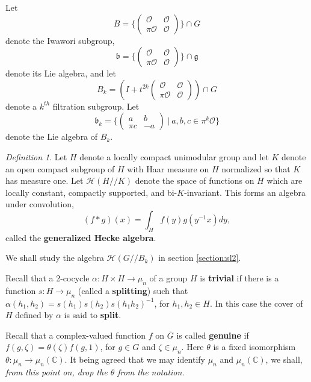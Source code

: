 \documentclass[12pt,letterpaper]{amsart}
\theoremstyle{definition}
\theoremstyle{remark}
\newtheorem{definition}[theorem]{Definition}
\begin{document}
Let
\[
B=\{
\left(
\begin{array}{cc}
\mathcal{O} & \mathcal{O}\\
\pi \mathcal{O} & \mathcal{O}
\end{array}
\right)\}\cap G
\]
denote the Iwawori subgroup,
\[
{\mathfrak{b}}=\{
\left(
\begin{array}{cc}
\mathcal{O} & \mathcal{O}\\
\pi \mathcal{O} & \mathcal{O}
\end{array}
\right)\}\cap \mathfrak{g}
\]
denote its Lie algebra, and let
\[
B_k=(I+t^{2k}\left(
\begin{array}{cc}
\mathcal{O} & \mathcal{O}\\
\pi \mathcal{O} & \mathcal{O}
\end{array}
\right))\cap G
\]
denote a $k^{th}$ filtration subgroup. Let
\[
{\mathfrak{b}}_k 
=\{
\left(
\begin{array}{cc}
a & b\\
\pi c & -a
\end{array}
\right)
\ |\ 
a,b,c\in \pi^{k}\mathcal{O}\}
\]
denote the Lie algebra of $B_k$. 

\begin{definition}
Let $H$ denote a locally compact unimodular group and 
let $K$ denote
an open compact subgroup of $H$ with Haar measure on 
$H$ normalized so that
$K$ has measure one. Let
$\mathcal{H}(H//K)$ denote the space of functions 
on $H$ which
are locally constant, compactly supported, and 
bi-$K$-invariant. This forms an
algebra under convolution,
\[
(f*g)(x)=\int_H f(y)g(y^{-1}x)dy,
\]
called the {\bf generalized Hecke algebra}.
\label{def:1}
\end{definition}

We shall study the algebra $\mathcal{H}(G//B_k)$ in section \ref{section:sl2}.

Recall that a 2-cocycle $\alpha :H\times H \rightarrow \mu_n$
of a group $H$ is {\bf trivial} if there is a function
$s:H\rightarrow \mu_n$ (called a {\bf splitting})
such that $\alpha(h_1,h_2)=s(h_1)s(h_2)s(h_1h_2)^{-1}$,
for $h_1,h_2\in H$. In this case the cover of $H$
defined by $\alpha$ is said to {\bf split}.

Recall that a complex-valued function $f$ on
$\overline{G}$
is called {\bf genuine} if $f(g,\zeta)
=\theta(\zeta) f(g,1)$, for
$g\in G$ and $\zeta\in \mu_n$. Here
$\theta$ is a fixed isomorphism 
$\theta:\mu_n\rightarrow \mu_n({\mathbb{C}})$.
It being agreed that we may identify
$\mu_n$ and $\mu_n({\mathbb{C}})$, we shall, {\it from this point on, 
drop the $\theta$ from the notation.}
\end{document}
